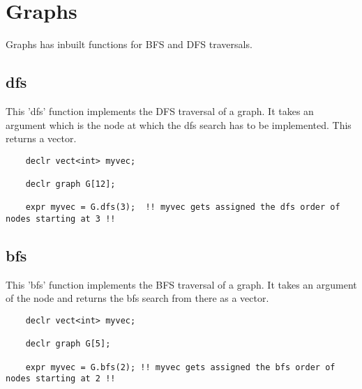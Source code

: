 \documentclass[journal, 18pt]{report}
\begin{document}
\section{Graphs}
Graphs has inbuilt functions for BFS and DFS traversals.
\subsection{dfs}
This 'dfs' function implements the DFS traversal of a graph. It takes an argument which is the node at which the dfs search has to be implemented. This returns a vector.\\
\begin{lstlisting}
    declr vect<int> myvec;
    
    declr graph G[12];
    
    expr myvec = G.dfs(3);  !! myvec gets assigned the dfs order of nodes starting at 3 !!
\end{lstlisting}
\subsection{bfs}
This 'bfs' function implements the BFS traversal of a graph. It takes an argument of the node and returns the bfs search from there as a vector.\\
\begin{lstlisting}
    declr vect<int> myvec;
    
    declr graph G[5];
    
    expr myvec = G.bfs(2); !! myvec gets assigned the bfs order of nodes starting at 2 !!
\end{lstlisting}
\end{document}
